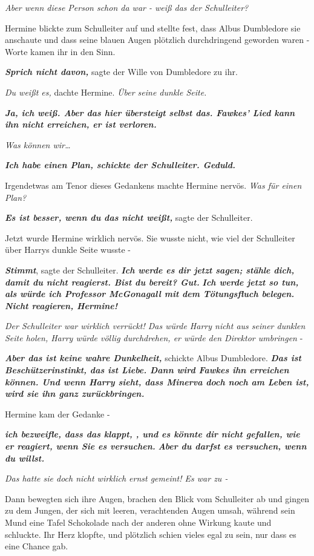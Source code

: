 {\emph{Aber wenn diese Person schon da war - weiß das der Schulleiter?}

Hermine blickte zum Schulleiter auf und stellte fest, dass Albus Dumbledore sie anschaute und dass seine blauen Augen plötzlich durchdringend geworden waren - Worte kamen ihr in den Sinn.

\textbf{\emph{Sprich nicht davon,}} sagte der Wille von Dumbledore zu ihr.

\emph{Du weißt es,} dachte Hermine. \emph{Über seine dunkle Seite.}

\textbf{\emph{Ja, ich weiß. Aber das hier übersteigt selbst das. Fawkes' Lied kann ihn nicht erreichen, er ist verloren.}}

\emph{Was können wir…}

\textbf{\emph{Ich habe einen Plan, schickte der Schulleiter. Geduld.}}

Irgendetwas am Tenor dieses Gedankens machte Hermine nervös. \emph{Was für einen Plan?}

\textbf{\emph{Es ist besser, wenn du das nicht weißt,}} sagte der Schulleiter.

Jetzt wurde Hermine wirklich nervös. Sie wusste nicht, wie viel der Schulleiter über Harrys dunkle Seite wusste -

\textbf{\emph{Stimmt}}, sagte der Schulleiter. \textbf{\emph{Ich werde es dir jetzt sagen; stähle dich, damit du nicht reagierst. Bist du bereit? Gut.}} \textbf{\emph{Ich werde jetzt so tun, als würde ich Professor McGonagall mit dem Tötungsfluch belegen. Nicht reagieren, Hermine!}}

\emph{Der Schulleiter war wirklich verrückt! Das würde Harry nicht aus seiner dunklen Seite holen, Harry würde völlig durchdrehen, er würde den Direktor umbringen} -

\textbf{\emph{Aber das ist keine wahre Dunkelheit,}} schickte Albus Dumbledore. \textbf{\emph{Das ist Beschützerinstinkt, das ist Liebe. Dann wird Fawkes ihn erreichen können. Und wenn Harry sieht, dass Minerva doch noch am Leben ist, wird sie ihn ganz zurückbringen.}}

Hermine kam der Gedanke -

\textbf{\emph{ich bezweifle, dass das klappt, , und es könnte dir nicht gefallen, wie er reagiert, wenn Sie es versuchen.}} \textbf{\emph{Aber du darfst es versuchen, wenn du willst.}}

\emph{Das hatte sie doch nicht wirklich ernst gemeint! Es war zu -}

Dann bewegten sich ihre Augen, brachen den Blick vom Schulleiter ab und gingen zu dem Jungen, der sich mit leeren, verachtenden Augen umsah, während sein Mund eine Tafel Schokolade nach der anderen ohne Wirkung kaute und schluckte. Ihr Herz klopfte, und plötzlich schien vieles egal zu sein, nur dass es eine Chance gab.

}
